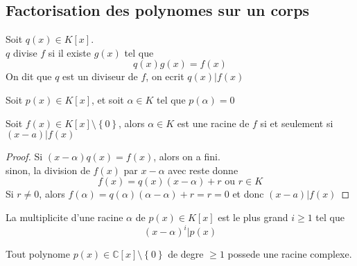 \documentclass[../main.tex]{subfiles}
\begin{document}
\subsection{Factorisation des polynomes sur un corps}
\begin{defn}
	Soit $q( x) \in K[x]$.\\
	$q$ divise $f$ si il existe $g( x) $ tel que
	\[ 
		q( x) g( x) = f( x) 
	\]
	On dit que $q$ est un diviseur de $f$, on ecrit $q( x) |f( x) $
	
\end{defn}
\begin{defn}[Racine]\label{defn:Racineracine}
	Soit $p( x) \in K[x]$, et soit $\alpha \in K$ tel que $p( \alpha ) =0$
\end{defn}
\begin{thm}
	Soit $f( x) \in K[x] \setminus  \left\{ 0 \right\}  $, alors $\alpha \in K$ est une racine de $f$ si et seulement si $( x-a) |f( x) $
\end{thm}
\begin{proof}
	Si $( x-\alpha) q( x) = f( x) $, alors on a fini.\\
	sinon, la division de $f( x)$ par $x-\alpha$ avec reste donne
	\[ 
		f( x) = q( x) ( x-\alpha) +r \text{ ou } r \in K
	\]
	Si $r\neq 0$, alors $f( \alpha) = q( \alpha) ( \alpha-\alpha) +r =r=0$ et donc $( x-a) | f( x) $	
\end{proof}
\begin{defn}
	La multiplicite d'une racine $\alpha$ de $p( x) \in K[x]$ est le plus grand $i\geq 1$ tel que 
	\[ 
		( x-\alpha) ^{i} | p( x) 
	\]
	
	
\end{defn}
\begin{thm}
	Tout polynome $p( x) \in \mathbb{C}[x]\setminus \left\{ 0 \right\} $ de degre $\geq 1$ possede une racine complexe.
	
\end{thm}
\end{document}
